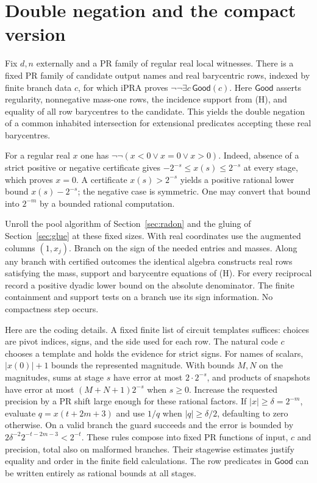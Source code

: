\documentclass[11pt,letterpaper]{article}
\theoremstyle{packet}\newtheorem{theorem}{Theorem}\newtheorem{lem}[theorem]{Lemma}
\newcommand{\head}[1]{\section{#1}}
\begin{document}
\newpage
\head{Double negation and the compact version}

\begin{prop}\label{prop:weak}
Fix $d,n$ externally and a PR family of regular real local witnesses. There is a fixed PR family of candidate output names and real barycentric rows, indexed by finite branch data $c$, for which iPRA proves $\neg\neg\exists c\,\mathsf{Good}(c)$. Here $\mathsf{Good}$ asserts regularity, nonnegative mass-one rows, the incidence support from (H), and equality of all row barycentres to the candidate. This yields the double negation of a common inhabited intersection for extensional predicates accepting these real barycentres.
\end{prop}

For a regular real $x$ one has $\neg\neg(x<0\lor x=0\lor x>0)$. Indeed, absence of a strict positive or negative certificate gives $-2^{-s}\le x(s)\le2^{-s}$ at every stage, which proves $x=0$. A certificate $x(s)>2^{-s}$ yields a positive rational lower bound $x(s)-2^{-s}$; the negative case is symmetric. One may convert that bound into $2^{-m}$ by a bounded rational computation.

Unroll the pool algorithm of Section~\ref{sec:radon} and the gluing of Section~\ref{sec:glue} at these fixed sizes. With real coordinates use the augmented columns $(1,x_j)$. Branch on the sign of the needed entries and masses. Along any branch with certified outcomes the identical algebra constructs real rows satisfying the mass, support and barycentre equations of (H). For every reciprocal record a positive dyadic lower bound on the absolute denominator. The finite containment and support tests on a branch use its sign information. No compactness step occurs.

Here are the coding details. A fixed finite list of circuit templates suffices: choices are pivot indices, signs, and the side used for each row. The natural code $c$ chooses a template and holds the evidence for strict signs. For names of scalars, $|x(0)|+1$ bounds the represented magnitude. With bounds $M,N$ on the magnitudes, sums at stage $s$ have error at most $2\cdot2^{-s}$, and products of snapshots have error at most $(M+N+1)2^{-s}$ when $s\ge0$. Increase the requested precision by a PR shift large enough for these rational factors. If $|x|\ge\delta=2^{-m}$, evaluate $q=x(t+2m+3)$ and use $1/q$ when $|q|\ge\delta/2$, defaulting to zero otherwise. On a valid branch the guard succeeds and the error is bounded by $2\delta^{-2}2^{-t-2m-3}<2^{-t}$. These rules compose into fixed PR functions of input, $c$ and precision, total also on malformed branches. Their stagewise estimates justify equality and order in the finite field calculations. The row predicates in $\mathsf{Good}$ can be written entirely as rational bounds at all stages.
\end{document}
